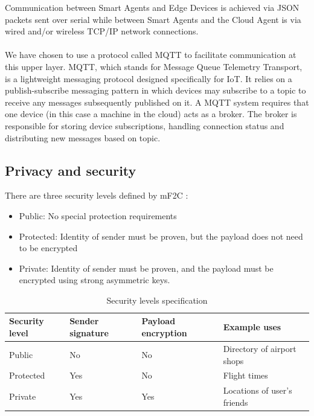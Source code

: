 Communication between Smart Agents and Edge Devices is achieved via JSON packets sent over serial while between Smart Agents and the Cloud Agent is via wired and/or wireless TCP/IP network connections.

\paragraph{}
We have chosen to use a protocol called MQTT to facilitate communication at this upper layer. MQTT, which stands for Message Queue Telemetry Transport, is a lightweight messaging protocol designed specifically for IoT. It relies on a publish-subscribe messaging pattern in which devices may subscribe to a topic to receive any messages subsequently published on it. A MQTT system requires that one device (in this case a machine in the cloud) acts as a broker. The broker is responsible for storing device subscriptions, handling connection status and distributing new messages based on topic.

\subsection{Privacy and security}

There are three security levels defined by mF2C \cite{mf2cwebsite}:

\begin{itemize}
    \item Public: No special protection requirements
    \item Protected: Identity of sender must be proven, but the payload does not need to be encrypted
    \item Private: Identity of sender must be proven, and the payload must be encrypted using strong asymmetric keys.
\end{itemize}

\begin{table}[h!]
    \begin{center}
        \begin{tabular}{ |p{2cm}|p{3cm}|p{3cm}|p{4cm}| }
            \hline
            Security level & Sender signature & Payload encryption & Example uses \\ \hline
            Public & No & No & Directory of airport shops \\ \hline
            Protected & Yes & No & Flight times \\ \hline
            Private & Yes & Yes & Locations of user's friends \\
            \hline
        \end{tabular}
        \caption{Security levels specification}
        \label{table:secure_levels}
    \end{center}
\end{table}

